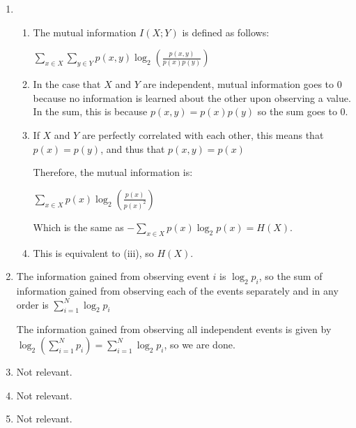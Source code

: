 


\begin{enumerate}[label=(\alph*)]
  \item

    \begin{enumerate}[label=(\roman*)]
      \item
        The mutual information $I(X;Y)$ is defined as follows:

        $\sum_{x \in X} \sum_{y \in Y} p(x,y) \log_2(\frac{p(x,y)}{p(x)p(y)})$
      \item

        In the case that $X$ and $Y$ are independent, mutual information goes to 0 because no information is learned about the other upon observing a value. In the sum, this is because $p(x,y) = p(x)p(y)$ so the sum goes to 0.

      \item
        If $X$ and $Y$ are perfectly correlated with each other, this means that $p(x) = p(y)$, and thus that $p(x,y) = p(x)$

        Therefore, the mutual information is:

        $\sum_{x \in X}p(x) \log_2(\frac{p(x)}{p(x)^2})$

        Which is the same as $-\sum_{x \in X}p(x)\log_2 p(x) = H(X)$.

      \item
        This is equivalent to (iii), so $H(X)$.






        
    \end{enumerate}

  \item
    The information gained from observing event $i$ is $\log_2 p_i$, so the sum of information gained from observing each of the events separately and in any order is $\sum_{i=1}^N \log_2 p_i$

    The information gained from observing all independent events is given by $\log_2 (\sum_{i=1}^N p_i) = \sum_{i=1}^N \log_2 p_i$, so we are done.

  \item
    Not relevant.


  \item
    Not relevant.

  \item
    Not relevant.
\end{enumerate}
    


